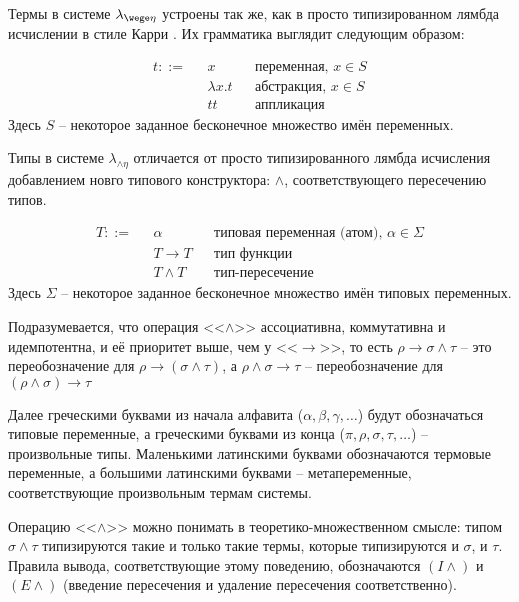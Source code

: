 \documentclass[../main.tex]{subfiles}
\begin{document}
\label{sec:the_system}

Термы в системе $\lambda_{\wege \eta}$ устроены так же, как в просто типизированном лямбда исчислении в стиле Карри \cite{curry_1969}. Их грамматика выглядит следующим образом:
\begin{definition}
\begin{align*}
t ::= & \text{ } x              && \text{переменная, $x \in S$}\\
      & \text{ } \lambda x . t  && \text{абстракция, $x \in S$}\\
      & \text{ } t t            && \text{аппликация}
\end{align*}
Здесь $S$ -- некоторое заданное бесконечное множество имён переменных.
\end{definition}


Типы в системе $\lambda_{\wedge \eta}$ отличается от просто типизированного лямбда исчисления добавлением новго типового конструктора: $\wedge$, соответствующего пересечению типов.

\begin{definition}
\begin{align*}
T ::= & \text{ } \alpha          && \text{типовая переменная (атом), $\alpha \in \Sigma$}\\
      & \text{ } T \to T         && \text{тип функции}\\
      & \text{ } T \wedge T      && \text{тип-пересечение}
\end{align*}
Здесь $\Sigma$ -- некоторое заданное бесконечное множество имён типовых переменных.
\end{definition}

Подразумевается, что операция <<$\wedge$>> ассоциативна, коммутативна и идемпотентна, и её приоритет выше, чем у <<$\to$>>, то есть $\rho \to \sigma \wedge \tau$ -- это переобозначение для $\rho \to (\sigma \wedge \tau)$, а $\rho \wedge \sigma \to \tau$ -- переобозначение для $(\rho \wedge \sigma) \to \tau$

Далее греческими буквами из начала алфавита ($\alpha, \beta, \gamma, \dots$) будут обозначаться типовые переменные, а греческими буквами из конца ($\pi, \rho, \sigma, \tau, \dots$) -- произвольные типы. Маленькими латинскими буквами обозначаются термовые переменные, а большими латинскими буквами -- метапеременные, соответствующие произвольным термам системы.


Операцию <<$\wedge$>> можно понимать в теоретико-множественном смысле: типом $\sigma \wedge \tau$ типизируются такие и только такие термы, которые типизируются и $\sigma$, и $\tau$. Правила вывода, соответствующие этому поведению, обозначаются $(I\wedge)$ и $(E\wedge)$ (введение пересечения и удаление пересечения соответственно). 
\end{document}
